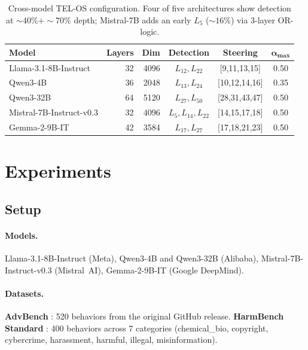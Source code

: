\documentclass{article}
\begin{document}
\begin{table}[t]
\centering
\small
\caption{Cross-model TEL-OS configuration.
Four of five architectures show detection at ${\sim}40\%{+}{\sim}70\%$ depth;
Mistral-7B adds an early $L_5$ (${\sim}16\%$) via 3-layer OR-logic.}
\label{tab:cross_model_config}
\begin{tabular}{lrrccc}
\toprule
\textbf{Model} & \textbf{Layers} & \textbf{Dim} &
\textbf{Detection} & \textbf{Steering} & $\boldsymbol{\alpha_{\max}}$ \\
\midrule
Llama-3.1-8B-Instruct     & 32 & 4096 & $L_{12}, L_{22}$         & [9,11,13,15]   & 0.50 \\
Qwen3-4B                  & 36 & 2048 & $L_{13}, L_{24}$         & [10,12,14,16]  & 0.35 \\
Qwen3-32B                 & 64 & 5120 & $L_{27}, L_{50}$         & [28,31,43,47]  & 0.50 \\
Mistral-7B-Instruct-v0.3  & 32 & 4096 & $L_{5}, L_{14}, L_{22}$ & [14,15,17,18]  & 0.50 \\
Gemma-2-9B-IT             & 42 & 3584 & $L_{17}, L_{27}$         & [17,18,21,23]  & 0.50 \\
\bottomrule
\end{tabular}
\end{table}

\section{Experiments}
\label{sec:experiments}

\subsection{Setup}

\paragraph{Models.}
Llama-3.1-8B-Instruct (Meta), Qwen3-4B and Qwen3-32B (Alibaba),
Mistral-7B-Instruct-v0.3 (Mistral~AI), Gemma-2-9B-IT (Google DeepMind).

\paragraph{Datasets.}
\textbf{AdvBench} \citep{zou2023universal}: 520 behaviors from the original GitHub
release.
\textbf{HarmBench Standard} \citep{mazeika2024harmbench}: 400 behaviors across
7 categories (chemical\_bio, copyright, cybercrime, harassment, harmful, illegal,
misinformation).
\end{document}
